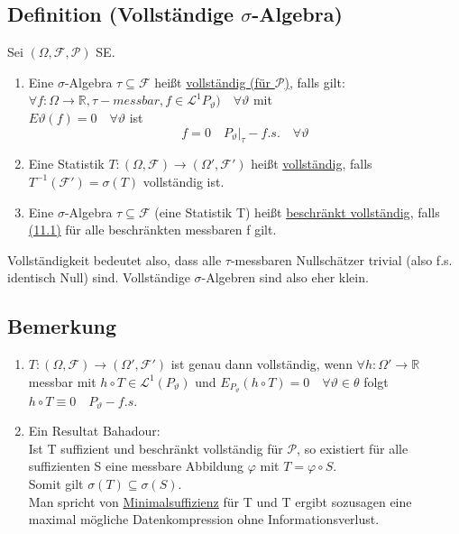 \documentclass[german,10pt,oneside, fleqn, a4paper]{article}
\newcommand {\R}	{\mathbb{R}}
\newcommand{\ra}{\rightarrow}
\newcommand{\brc}[1]{\left(#1\right)}
\newcommand{\mc}[1]{\mathcal{#1}}
\newcommand{\lp}[1]{\mc{L}^{#1}}
\newcommand{\1}[1]{1_{#1}}
\newcommand{\2}[1]{\1{\brac{#1}}}
\newcommand{\rraum}{\brc{\Omega,\mc{F},\mc{P}}}
\newcommand{\f}{\mc{F}}
\newcommand{\p}{\mc{P}}
\begin{document}
\subsection{Definition (Vollständige $\sigma$-Algebra)}
\label{11.5}
Sei $\rraum$ SE.\begin{enumerate}[label=(\alph*)]
\item Eine $\sigma$-Algebra $\tau\subseteq\f$ heißt \underline{vollständig (für $\p$)}, falls gilt:\\
$\forall f:\Omega\ra\R, \tau-messbar, f\in\lp{1}P_\vartheta)\quad \forall\vartheta$ mit \\
$E\vartheta(f)=0\quad\forall\vartheta$ ist\[
f=0\quad P_\vartheta\vert_\tau-f.s.\quad\forall\vartheta\]
\item Eine Statistik $T:(\Omega,\f)\ra(\Omega',\f')$ heißt \underline{vollständig}, falls  $T^{-1}(\f')=\sigma(T)$ vollständig ist.
\item Eine $\sigma$-Algebra $\tau\subseteq\f$ (eine Statistik T) heißt \underline{beschränkt vollständig}, falls \hyperref[11.1]{(11.1)} für alle beschränkten messbaren f gilt.
\end{enumerate}
Vollständigkeit bedeutet also, dass alle $\tau$-messbaren Nullschätzer trivial (also f.s. identisch Null) sind. Vollständige $\sigma$-Algebren sind also eher klein.

\subsection{Bemerkung}
\label{11.6}
\begin{enumerate}[label=(\roman*)]
\item $T:(\Omega,\f)\ra(\Omega',\f')$ ist genau dann vollständig, wenn $\forall h:\Omega'\ra\R$ messbar mit $h\circ T\in\lp{1}(P_\vartheta)$ und $E_{P_\vartheta}(h\circ T)=0\quad\forall\vartheta\in\theta$ folgt $h\circ T\equiv0\quad P_\vartheta-f.s.$
\item Ein Resultat Bahadour:\\
Ist T suffizient und beschränkt vollständig für $\mc{P}$, so existiert für alle suffizienten S eine messbare Abbildung $\varphi$ mit $T=\varphi\circ S$.\\
Somit gilt $\sigma(T)\subseteq\sigma(S)$.\\
Man spricht von \underline{Minimalsuffizienz} für T und T ergibt sozusagen eine maximal mögliche Datenkompression ohne Informationsverlust.
\end{enumerate}
\end{document}
